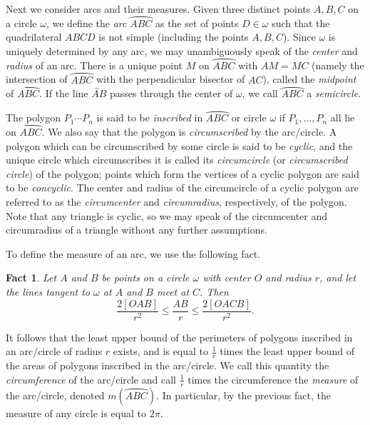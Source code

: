 \documentclass[12pt]{book}
\numberwithin{exc}{section}
\numberwithin{figure}{section}
\newtheorem{fact}[theorem]{Fact}
\numberwithin{equation}{theorem}
\def\line#1{\overleftrightarrow{#1}}
\def\arc#1{\wideparen{#1}}
\begin{document}
Next we consider arcs and their measures.
Given three distinct points $A,B,C$ on a circle $\omega$,
we define the \emph{arc} 
$\arc{ABC}$ as the set of points $D \in \omega$
such that the quadrilateral $ABCD$ is not simple (including the
points $A,B,C$).
Since $\omega$ is uniquely determined by any arc, we may
unambiguously speak of the \emph{center} and \emph{radius} of an arc.
 
There is a unique point
$M$ on $\arc{ABC}$ with $AM = MC$ (namely the intersection of $\arc{ABC}$
with the perpendicular bisector of $AC$), called the
\emph{midpoint}  of $\arc{ABC}$.
If the line $\line{AB}$ passes through the center of $\omega$, we call
$\arc{ABC}$ a \emph{semicircle}. 

The polygon $P_1 \cdots P_n$ is said to be
\emph{inscribed} 
in $\arc{ABC}$ or circle $\omega$ if $P_1, \dots, P_n$ all lie on $\arc{ABC}$.
We also say that the polygon is \emph{circumscribed}
by the arc/circle. A polygon which can be circumscribed by some circle
is said to be \emph{cyclic},  and the
unique circle which circumscribes it is called its
\emph{circumcircle} (or \emph{circumscribed circle})
of the polygon; points which form the vertices of a 
cyclic polygon are said to be \emph{concyclic}.
The center and radius of the circumcircle of a cyclic polygon are
referred to as the \emph{circumcenter}  and \emph{circumradius},  respectively, of the polygon.
Note that any triangle is cyclic, so we may speak of the circumcenter and
circumradius of a triangle without any further assumptions.

To define the measure of an arc, we use the following fact.
\begin{fact}
Let $A$ and $B$ be points on a circle $\omega$ with center $O$ and radius
$r$, and let the lines tangent to $\omega$ at $A$ and $B$ meet at $C$. Then
\[
\frac{2[OAB]}{r^2} \leq \frac{AB}{r} \leq \frac{2[OACB]}{r^2}.
\]
\end{fact}
It follows that the least upper bound of the perimeters of polygons
inscribed in an arc/circle of radius $r$ exists, and is equal to
$\frac{1}{r}$ times the least upper bound of the areas of polygons
inscribed in the arc/circle. We call this quantity the
\emph{circumference} of the arc/circle
and call $\frac{1}{r}$ times the circumference the
\emph{measure} of the arc/circle, denoted $m(\arc{ABC})$.
In particular, by the previous fact, the measure of any circle is
equal to $2\pi$.
\end{document}
